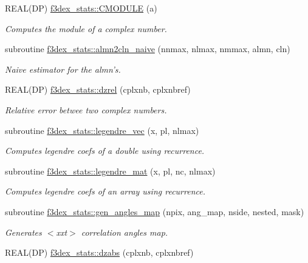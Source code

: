 \begin{DoxyCompactItemize}
\item 
REAL(DP) \hyperlink{namespacef3dex__stats_a2c704cb2c5b38f77b70a5c9783660912}{f3dex\_\-stats::CMODULE} (a)
\begin{DoxyCompactList}\small\item\em Computes the module of a complex number. \end{DoxyCompactList}\item 
subroutine \hyperlink{namespacef3dex__stats_af82543b20c426be1736a4fed0d1ca80c}{f3dex\_\-stats::almn2cln\_\-naive} (nnmax, nlmax, nmmax, almn, cln)
\begin{DoxyCompactList}\small\item\em Naive estimator for the almn's. \end{DoxyCompactList}\item 
REAL(DP) \hyperlink{namespacef3dex__stats_afc9d6ca61536648a01f8b6769080283e}{f3dex\_\-stats::dzrel} (cplxnb, cplxnbref)
\begin{DoxyCompactList}\small\item\em Relative error betwee two complex numbers. \end{DoxyCompactList}\item 
subroutine \hyperlink{namespacef3dex__stats_a1f360b2a41b5a63c3379390a55ef07b2}{f3dex\_\-stats::legendre\_\-vec} (x, pl, nlmax)
\begin{DoxyCompactList}\small\item\em Computes legendre coefs of a double using recurrence. \end{DoxyCompactList}\item 
subroutine \hyperlink{namespacef3dex__stats_aa2fb45e013179295e3b876ced9eff015}{f3dex\_\-stats::legendre\_\-mat} (x, pl, nc, nlmax)
\begin{DoxyCompactList}\small\item\em Computes legendre coefs of an array using recurrence. \end{DoxyCompactList}\item 
subroutine \hyperlink{namespacef3dex__stats_ac34a6421249816395b51048aa0a3dde3}{f3dex\_\-stats::gen\_\-angles\_\-map} (npix, ang\_\-map, nside, nested, mask)
\begin{DoxyCompactList}\small\item\em Generates $<$xxt$>$ correlation angles map. \end{DoxyCompactList}\item 
REAL(DP) \hyperlink{namespacef3dex__stats_a70ed2d6cd6c25b9cd95b04e9223e5828}{f3dex\_\-stats::dzabs} (cplxnb, cplxnbref)

\end{DoxyCompactItemize}
